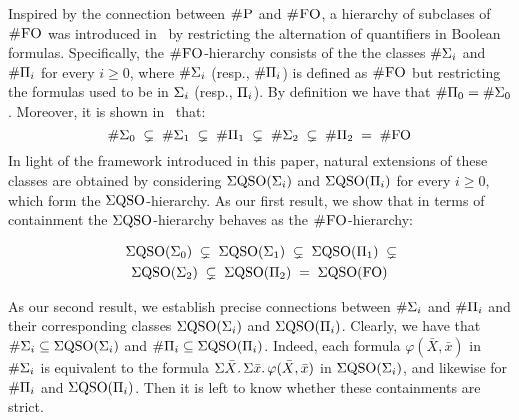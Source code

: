 
Inspired by the connection between $\text{\sc \#P}$ and $\text{\sc \#FO}$, a hierarchy of subclases of $\text{\sc \#FO}$ was introduced in~\cite{SalujaST95} 
by restricting the alternation of quantifiers in Boolean formulas.
Specifically, the $\text{\sc \#FO}$-hierarchy consists of the 
the classes $\#\Sigma_{i}$ and $\#\Pi_{i}$ for every $i \geq 0$, where $\#\Sigma_{i}$ (resp., $\#\Pi_{i}$) is defined as $\text{\sc \#FO}$ but restricting the formulas used to be in $\Sigma_{i}$ (resp., $\Pi_{i}$).
By definition we have that $\#\Pi_{0} = \#\Sigma_{0}$. Moreover, it is shown in~\cite{SalujaST95} that:
\[
\#\Sigma_{0} \; \subsetneq \; \#\Sigma_{1} \; \subsetneq \; \#\Pi_{1} \; \subsetneq \; \#\Sigma_{2} \; \subsetneq \; \#\Pi_{2} \; = \; \#{\rm FO} 
\]
In light of the framework introduced in this paper, natural extensions of these classes are obtained by considering 
$\Sigma{\rm QSO}(\Sigma_{i})$ and $\Sigma{\rm QSO}(\Pi_{i})$ for every $i \geq 0$, which form the $\Sigma{\rm QSO}$-hierarchy.
As our first result, we show that in terms of containment the $\Sigma{\rm QSO}$-hierarchy behaves as the $\text{\sc \#FO}$-hierarchy:
\begin{proposition}
\begin{multline*}
\; \Sigma{\rm QSO}(\Sigma_{0}) \; \subsetneq \; \Sigma{\rm QSO}(\Sigma_{1}) \; \subsetneq \; \Sigma{\rm QSO}(\Pi_{1}) \; \subsetneq \\ \Sigma{\rm QSO}(\Sigma_{2}) \; \subsetneq \; \Sigma{\rm QSO}(\Pi_{2}) \; = \; \Sigma{\rm QSO}({\rm FO})
\end{multline*}
\end{proposition}
As our second result, we establish precise connections between 
$\#\Sigma_{i}$ and $\#\Pi_{i}$ and their corresponding classes $\Sigma{\rm QSO}(\Sigma_{i})$ and $\Sigma{\rm QSO}(\Pi_{i})$. Clearly, we have that $\#\Sigma_{i} \subseteq \Sigma{\rm QSO}(\Sigma_{i})$ and $\#\Pi_{i} \subseteq \Sigma{\rm QSO}(\Pi_{i})$. Indeed, each formula $\varphi(\bar{X}, \bar{x})$ in $\#\Sigma_{i}$ is equivalent to the formula $\Sigma{\bar X}.\, \Sigma{\bar x}.\, \varphi(\bar{X}, \bar{x})$ in $\Sigma{\rm QSO}(\Sigma_{i})$, and likewise for $\#\Pi_{i}$ and $\Sigma{\rm QSO}(\Pi_{i})$.
Then it is left to know whether these containments are strict.

